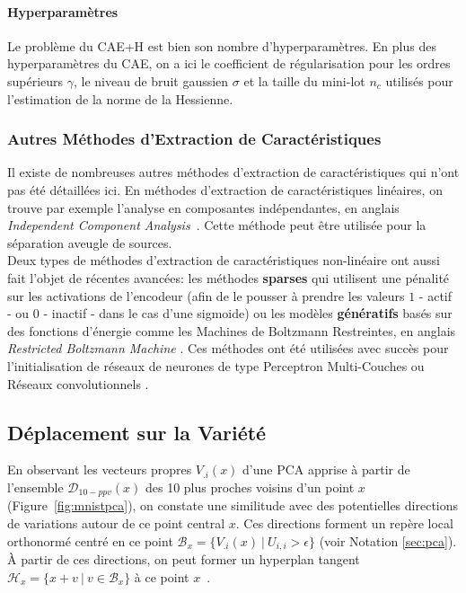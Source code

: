 \paragraph{Hyperparamètres} Le problème du CAE+H est bien son nombre
d'hyperparamètres. En plus des hyperparamètres du CAE, on a ici le coefficient
de régularisation pour les ordres supérieurs $\gamma$, le niveau de bruit
gaussien $\sigma$ et la taille du mini-lot $n_c$ utilisés pour l'estimation de
la norme de la Hessienne.

\subsubsection{Autres Méthodes d'Extraction de Caractéristiques}

Il existe de nombreuses autres méthodes d'extraction de caractéristiques qui
n'ont pas été détaillées ici. En méthodes d'extraction de caractéristiques
linéaires, on trouve par exemple l'analyse en composantes indépendantes, en
anglais \textit{Independent Component Analysis}~\citep{Comon94,Hyvarinen-2001}.
Cette méthode peut être utilisée pour la séparation aveugle de sources.  \\

Deux types de méthodes d'extraction de caractéristiques non-linéaire  ont aussi
fait l'objet de récentes avancées: les méthodes {\bf sparses}
\citep{ranzato-08,koray-psd-08,Koray-08} qui utilisent une pénalité sur les
activations de l'encodeur (afin de le pousser à prendre les valeurs $1$ - actif
- ou $0$ - inactif - dans le cas d'une sigmoide)  ou les modèles {\bf
génératifs} basés sur des fonctions d'énergie \citep{ranzato-unsup-07} comme les
Machines de Boltzmann Restreintes, en anglais \textit{Restricted Boltzmann
Machine} \citep{Tieleman08}.  Ces méthodes ont été utilisées avec succès pour
l'initialisation de réseaux de neurones de type Perceptron Multi-Couches
\citep{HintonG2006,ranzato-08,koray-psd-08,Koray-08} ou Réseaux convolutionnels
\citep{koray-nips-10-small}. 

\subsection{Déplacement sur la Variété}

En observant les vecteurs propres $V_{.i}(x)$ d'une PCA apprise à partir de
l'ensemble $\mathcal{D}_{10-ppv}(x)$ des 10 plus proches voisins d'un point $x$
(Figure~\ref{fig:mnistpca}), on constate une similitude avec des potentielles
directions de variations autour de ce point central $x$.  Ces directions
forment un repère local orthonormé centré en ce point $\mathcal{B}_{x}=\lbrace
V_{.i}(x)~|~U_{i,i} > \epsilon\rbrace$ (voir Notation \ref{sec:pca}). À partir
de ces directions, on peut former un hyperplan tangent $\mathcal{H}_{x}=\lbrace
x + v~|~v\in\mathcal{B}_{x} \rbrace$ à ce point $x$~\citep{Dauphin-et-al-NIPS2011}.


